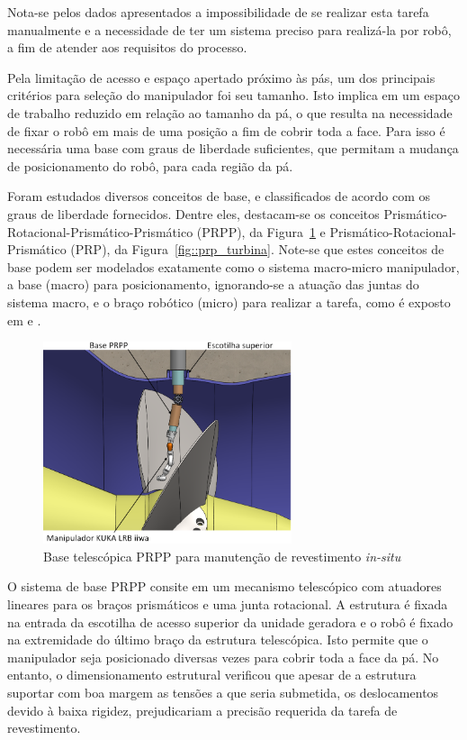 Nota-se pelos dados apresentados a impossibilidade de se realizar esta tarefa
manualmente e a necessidade de ter um sistema preciso para realizá-la por robô,
a fim de atender aos requisitos do processo.

Pela limitação de acesso e espaço apertado próximo às pás, um dos principais
critérios para seleção do manipulador foi seu tamanho. Isto implica em um
espaço de trabalho reduzido em relação ao tamanho da pá, o que resulta na
necessidade de fixar o robô em mais de uma posição a fim de cobrir
toda a face. Para isso é necessária uma base com graus de liberdade suficientes,
que permitam a mudança de posicionamento do robô, para cada região da pá. 

Foram estudados diversos conceitos de base, e classificados de acordo com os
graus de liberdade fornecidos. Dentre eles, destacam-se os conceitos
Prismático-Rotacional-Prismático-Prismático (PRPP), da
Figura~\ref{fig::base_telesc_turbina} e Prismático-Rotacional-Prismático (PRP),
da Figura~\ref{fig::prp_turbina}. Note-se que estes conceitos de base podem ser
modelados exatamente como o sistema macro-micro manipulador, a base (macro) para
posicionamento, ignorando-se a atuação das juntas do sistema macro, e o braço
robótico (micro) para realizar a tarefa, como é exposto em
\cite{sharon1993macro} e \cite{lew1994bracing}.

\begin{figure}[h]
	\centering 
 	\includegraphics[width=0.65\textwidth]{figs/base_telesc_turbina}
 	\caption{Base telescópica PRPP para manutenção de revestimento
 	\textit{in-situ}}
 	\label{fig::base_telesc_turbina}
\end{figure}

O sistema de base PRPP consite em um mecanismo telescópico com atuadores
lineares para os braços prismáticos e uma junta rotacional. A estrutura é fixada
na entrada da escotilha de acesso superior da unidade geradora e o robô é fixado
na extremidade do último braço da estrutura telescópica. Isto permite que o
manipulador seja posicionado diversas vezes para cobrir toda a face da pá. No
entanto, o dimensionamento estrutural verificou que apesar de a estrutura
suportar com boa margem as tensões a que seria submetida, os deslocamentos
devido à baixa rigidez, prejudicariam a precisão requerida da tarefa de
revestimento.

